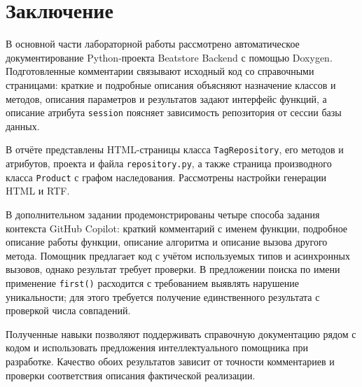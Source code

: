\section{Заключение}

В основной части лабораторной работы рассмотрено автоматическое
документирование Python-проекта Beatstore Backend с помощью Doxygen.
Подготовленные комментарии связывают исходный код со справочными страницами:
краткие и подробные описания объясняют назначение классов и методов,
описания параметров и результатов задают интерфейс функций, а описание
атрибута \texttt{session} поясняет зависимость репозитория от сессии базы данных.

В отчёте представлены HTML-страницы класса \texttt{TagRepository}, его методов
и атрибутов, проекта и файла \texttt{repository.py}, а также страница производного
класса \texttt{Product} с графом наследования. Рассмотрены настройки генерации
HTML и RTF.

В дополнительном задании продемонстрированы четыре способа задания контекста
GitHub Copilot: краткий комментарий с именем функции, подробное описание
работы функции, описание алгоритма и описание вызова другого метода.
Помощник предлагает код с учётом используемых типов и асинхронных вызовов,
однако результат требует проверки. В предложении поиска по имени применение
\texttt{first()} расходится с требованием выявлять нарушение уникальности;
для этого требуется получение единственного результата с проверкой числа
совпадений.

Полученные навыки позволяют поддерживать справочную документацию рядом
с кодом и использовать предложения интеллектуального помощника при
разработке. Качество обоих результатов зависит от точности комментариев
и проверки соответствия описания фактической реализации.
